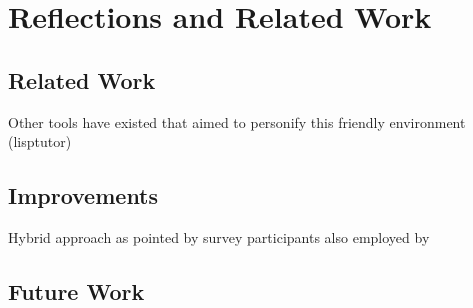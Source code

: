 \chapter{Reflections and Related Work}
\label{chap:reflection}
\section{Related Work}
Other tools have existed that aimed to personify this friendly environment (lisptutor)

\section{Improvements}
Hybrid approach as pointed by survey participants also employed by \cite{harris_team, team_meta}

\section{Future Work}
